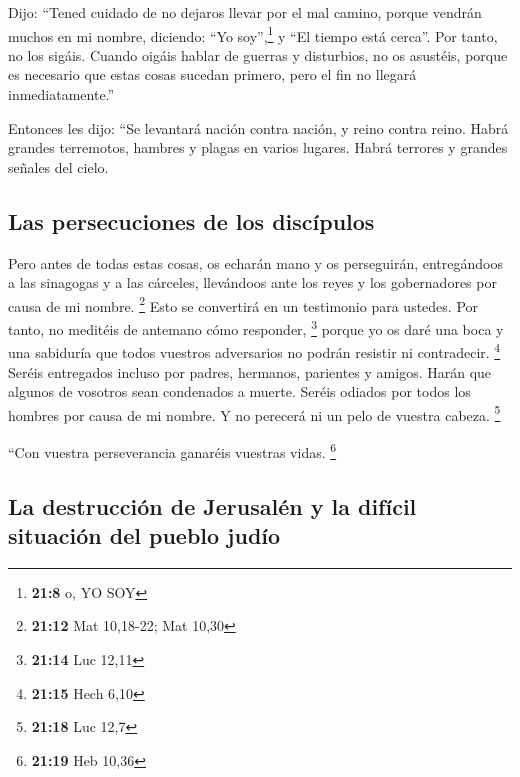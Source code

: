  Dijo: ``Tened cuidado de no dejaros llevar por el mal
camino, porque vendrán muchos en mi nombre, diciendo: ``Yo
soy'',\footnote{\textbf{21:8} o, YO SOY} y ``El tiempo está cerca''. Por
tanto, no los sigáis.  Cuando oigáis hablar de guerras y
disturbios, no os asustéis, porque es necesario que estas cosas sucedan
primero, pero el fin no llegará inmediatamente.''

 Entonces les dijo: ``Se levantará nación contra nación,
y reino contra reino.  Habrá grandes terremotos, hambres
y plagas en varios lugares. Habrá terrores y grandes señales del cielo.

\hypertarget{las-persecuciones-de-los-discuxedpulos}{%
\subsection{Las persecuciones de los
discípulos}\label{las-persecuciones-de-los-discuxedpulos}}

 Pero antes de todas estas cosas, os echarán mano y os
perseguirán, entregándoos a las sinagogas y a las cárceles, llevándoos
ante los reyes y los gobernadores por causa de mi nombre. \footnote{\textbf{21:12}
  Mat 10,18-22; Mat 10,30}  Esto se convertirá en un
testimonio para ustedes.  Por tanto, no meditéis de
antemano cómo responder, \footnote{\textbf{21:14} Luc 12,11}
 porque yo os daré una boca y una sabiduría que todos
vuestros adversarios no podrán resistir ni contradecir. \footnote{\textbf{21:15}
  Hech 6,10}  Seréis entregados incluso por padres,
hermanos, parientes y amigos. Harán que algunos de vosotros sean
condenados a muerte.  Seréis odiados por todos los
hombres por causa de mi nombre.  Y no perecerá ni un pelo
de vuestra cabeza. \footnote{\textbf{21:18} Luc 12,7}

 ``Con vuestra perseverancia ganaréis vuestras vidas.
\footnote{\textbf{21:19} Heb 10,36}

\hypertarget{la-destrucciuxf3n-de-jerusaluxe9n-y-la-difuxedcil-situaciuxf3n-del-pueblo-juduxedo}{%
\subsection{La destrucción de Jerusalén y la difícil situación del
pueblo
judío}\label{la-destrucciuxf3n-de-jerusaluxe9n-y-la-difuxedcil-situaciuxf3n-del-pueblo-juduxedo}}

